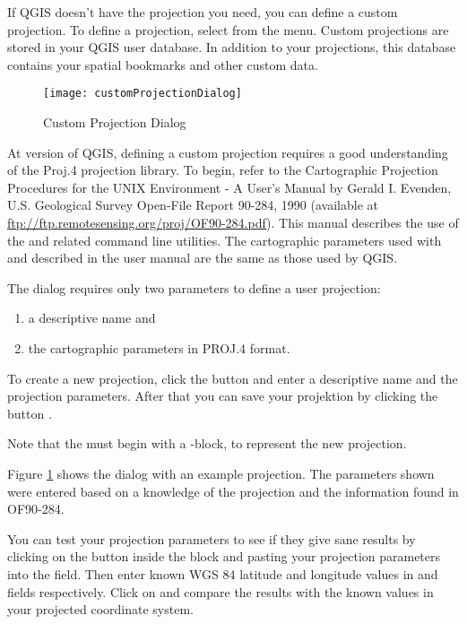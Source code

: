 If QGIS doesn't have the projection you need, you can define a custom
projection. To define a projection, select  from
the  menu. Custom projections are stored in your QGIS user
database. In addition to your projections, this database contains your spatial
bookmarks and other custom data. 

\begin{figure}[ht]
   \begin{center}
   \caption{Custom Projection Dialog}\label{fig:customprojections}\smallskip
   \texttt{[image: customProjectionDialog]}
\end{center}  
\end{figure}

At version \CURRENT of QGIS, defining a custom projection requires a good
understanding of the Proj.4 projection library. To begin, refer to the
Cartographic Projection Procedures for the UNIX Environment - A User's Manual
by Gerald I. Evenden, U.S. Geological Survey Open-File Report 90-284, 1990
(available at \url{ftp://ftp.remotesensing.org/proj/OF90-284.pdf}).
This manual describes the use of the  and related command line
utilities. The cartographic parameters used with  and described
in the user manual are the same as those used by QGIS. 

The  dialog requires
only two parameters to define a user projection: 
\begin{enumerate}
\item a descriptive name and
\item the cartographic parameters in PROJ.4 format.
\end{enumerate}
To create a new projection, click the 
 button and enter a descriptive
name and the projection parameters. 
After that you can save your projektion by clicking the button
.

Note that the  must begin with a -block,
to represent the new projection.

Figure \ref{fig:customprojections} shows
the dialog with an example projection. The parameters shown were entered based
on a knowledge of the projection and the information found in OF90-284.

You can test your projection parameters to see if they give sane results by
clicking on the  button inside the  block 
and pasting your projection parameters into
the  field. Then enter known WGS 84 latitude and longitude
values in  and  fields respectively. 
Click on  and compare the results with the known values in your projected coordinate
system. 

